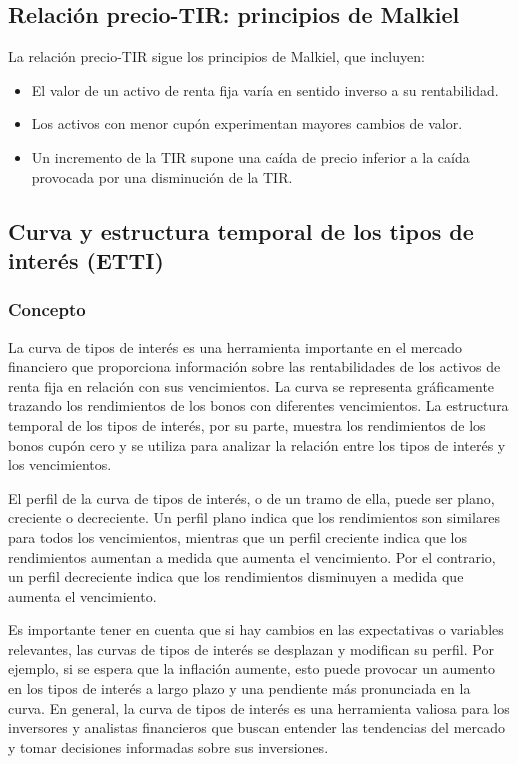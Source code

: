 \documentclass[
  letterpaper,
  DIV=11,
  numbers=noendperiod]{scrreprt}
\providecommand{\tightlist}{%
  \setlength{\itemsep}{0pt}\setlength{\parskip}{0pt}}\usepackage{longtable,booktabs,array}
\begin{document}
\begin{tcolorbox}
\subsection{Relación precio-TIR: principios de
Malkiel}\label{relaciuxf3n-precio-tir-principios-de-malkiel}

La relación precio-TIR sigue los principios de Malkiel, que incluyen:

\begin{itemize}
\tightlist
\item
  El valor de un activo de renta fija varía en sentido inverso a su
  rentabilidad.
\item
  Los activos con menor cupón experimentan mayores cambios de valor.
\item
  Un incremento de la TIR supone una caída de precio inferior a la caída
  provocada por una disminución de la TIR.
\end{itemize}

\subsection{Curva y estructura temporal de los tipos de interés
(ETTI)}\label{curva-y-estructura-temporal-de-los-tipos-de-interuxe9s-etti}

\subsubsection{Concepto}\label{concepto-2}

La curva de tipos de interés es una herramienta importante en el mercado
financiero que proporciona información sobre las rentabilidades de los
activos de renta fija en relación con sus vencimientos. La curva se
representa gráficamente trazando los rendimientos de los bonos con
diferentes vencimientos. La estructura temporal de los tipos de interés,
por su parte, muestra los rendimientos de los bonos cupón cero y se
utiliza para analizar la relación entre los tipos de interés y los
vencimientos.

El perfil de la curva de tipos de interés, o de un tramo de ella, puede
ser plano, creciente o decreciente. Un perfil plano indica que los
rendimientos son similares para todos los vencimientos, mientras que un
perfil creciente indica que los rendimientos aumentan a medida que
aumenta el vencimiento. Por el contrario, un perfil decreciente indica
que los rendimientos disminuyen a medida que aumenta el vencimiento.

Es importante tener en cuenta que si hay cambios en las expectativas o
variables relevantes, las curvas de tipos de interés se desplazan y
modifican su perfil. Por ejemplo, si se espera que la inflación aumente,
esto puede provocar un aumento en los tipos de interés a largo plazo y
una pendiente más pronunciada en la curva. En general, la curva de tipos
de interés es una herramienta valiosa para los inversores y analistas
financieros que buscan entender las tendencias del mercado y tomar
decisiones informadas sobre sus inversiones.


\end{tcolorbox}
\end{document}
